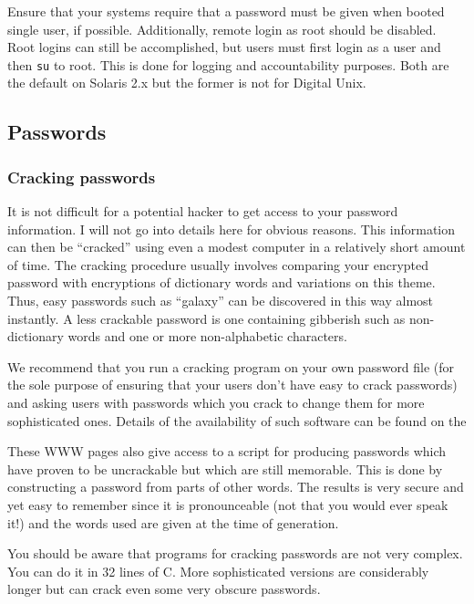 Ensure that your systems require that a password must be given when
booted single user, if possible. Additionally, remote login as root
should be disabled.  Root logins can still be accomplished, but users
must first login as a user and then {\tt su} to root. This is done for
logging and accountability purposes. Both are the default on Solaris
2.x but the former is not for Digital Unix. 

\subsection{Passwords}

\subsubsection{Cracking passwords}

It is not difficult for a potential hacker to get access to your
password information. I will not go into details here for obvious
reasons. This information can then be ``cracked'' using even a modest
computer in a relatively short amount of time. The cracking procedure
usually involves comparing your encrypted password with encryptions of
dictionary words and variations on this theme. Thus, easy passwords
such as ``galaxy'' can be discovered in this way almost instantly. A
less crackable password is one containing gibberish such as
non-dictionary words and one or more non-alphabetic characters.

We recommend that you run a cracking program on your own password file
(for the sole purpose of ensuring that your users don't have easy to
crack passwords) and asking users with passwords which you crack to
change them for more sophisticated ones. Details of the availability of
such software can be found on the

These WWW pages also give access to a script for producing passwords
which have proven to be uncrackable but which are still memorable.
This is done by constructing a password from parts of other words.  The
results is very secure and yet easy to remember since it is
pronounceable (not that you would ever speak it!) and the words used
are given at the time of generation.

You should be aware that programs for cracking passwords are not very
complex. You can do it in 32 lines of C. More sophisticated versions are
considerably longer but can crack even some very obscure passwords.

